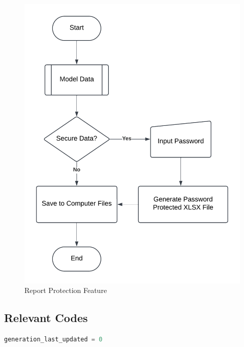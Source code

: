 \begin{appendices}
\begin{centerappendixtitle}
		\begin{figure}[h]
			\centering
			\caption{Report Protection Feature}
			\label{protectFlow}
			\includegraphics[width=\textwidth,height=\textheight,keepaspectratio]{appendix/protect f}
		\end{figure}
		
		
		
	\end{centerappendixtitle}
	
	\begin{centerappendixtitle}
		\chapter{Relevant Codes}
		\pagebreak
		
		
		\begin{lstlisting}[language=Python, caption={Genetic Algorithm}, label={genalgoCode}, breaklines=true]
 generation_last_updated = 0


\end{lstlisting}
\end{centerappendixtitle}
\end{appendices}
